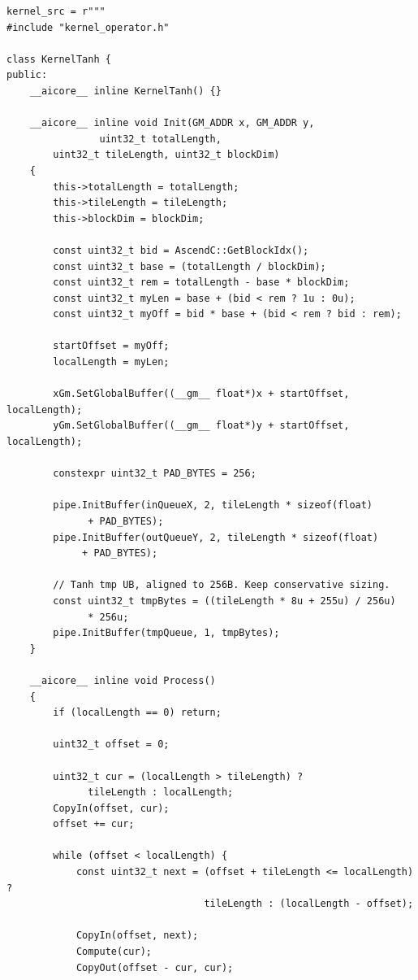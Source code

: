 \documentclass{article} %
\theoremstyle{definition}
\theoremstyle{remark}
\begin{document}
  \begin{tcolorbox}[colback=red!5, colframe=red!30, boxrule=0.3pt, arc=0pt, left=2pt, right=2pt, top=0pt, bottom=0pt, breakable, nobeforeafter]
  \begin{verbatim}
kernel_src = r"""
#include "kernel_operator.h"

class KernelTanh {
public:
    __aicore__ inline KernelTanh() {}

    __aicore__ inline void Init(GM_ADDR x, GM_ADDR y, 
                uint32_t totalLength, 
        uint32_t tileLength, uint32_t blockDim)
    {
        this->totalLength = totalLength;
        this->tileLength = tileLength;
        this->blockDim = blockDim;

        const uint32_t bid = AscendC::GetBlockIdx();
        const uint32_t base = (totalLength / blockDim);
        const uint32_t rem = totalLength - base * blockDim;
        const uint32_t myLen = base + (bid < rem ? 1u : 0u);
        const uint32_t myOff = bid * base + (bid < rem ? bid : rem);

        startOffset = myOff;
        localLength = myLen;

        xGm.SetGlobalBuffer((__gm__ float*)x + startOffset, localLength);
        yGm.SetGlobalBuffer((__gm__ float*)y + startOffset, localLength);

        constexpr uint32_t PAD_BYTES = 256;

        pipe.InitBuffer(inQueueX, 2, tileLength * sizeof(float) 
              + PAD_BYTES);
        pipe.InitBuffer(outQueueY, 2, tileLength * sizeof(float) 
             + PAD_BYTES);

        // Tanh tmp UB, aligned to 256B. Keep conservative sizing.
        const uint32_t tmpBytes = ((tileLength * 8u + 255u) / 256u) 
              * 256u;
        pipe.InitBuffer(tmpQueue, 1, tmpBytes);
    }

    __aicore__ inline void Process()
    {
        if (localLength == 0) return;

        uint32_t offset = 0;

        uint32_t cur = (localLength > tileLength) ? 
              tileLength : localLength;
        CopyIn(offset, cur);
        offset += cur;

        while (offset < localLength) {
            const uint32_t next = (offset + tileLength <= localLength) ? 
                                  tileLength : (localLength - offset);

            CopyIn(offset, next);
            Compute(cur);
            CopyOut(offset - cur, cur);


\end{verbatim}
\end{tcolorbox}
\end{document}
